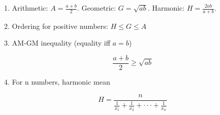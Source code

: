 1. Arithmetic: $A = \frac{a+b}{2}$. Geometric: $G = \sqrt{ab}$. Harmonic: $H = \frac{2ab}{a+b}$.

2. Ordering for positive numbers: $H \le G \le A$

3. AM-GM inequality (equality iff $a = b$)

$$ \frac{a+b}{2} \ge \sqrt{ab} $$

4. For n numbers, harmonic mean

$$ H = \frac{n}{\frac{1}{x_1}+\frac{1}{x_2}+\cdot\cdot\cdot+\frac{1}{x_n}} $$
